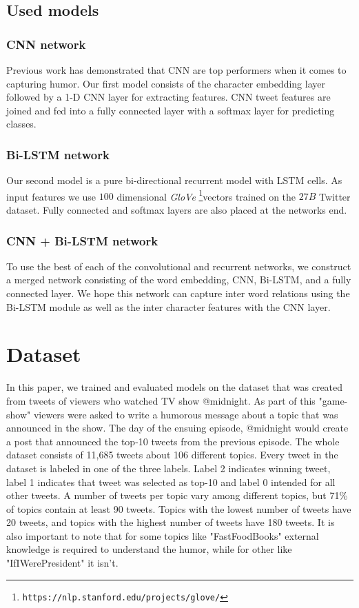 \documentclass[10pt, a4paper]{article}
\begin{document}
\subsection{Used models}

\subsubsection{CNN network}
Previous work \citep{onaj_rad_s_cnn} has demonstrated that CNN are top performers
when it comes to capturing humor. Our first model consists of the character
embedding layer followed by a 1-D CNN layer for extracting features. CNN tweet
features are joined and fed into a fully connected layer with a softmax layer
for predicting classes. 

\subsubsection{Bi-LSTM network}
Our second model is a pure bi-directional recurrent model with LSTM cells. As
input features we use $100$ dimensional \emph{GloVe}
\citep{GLove}\footnote{\texttt{https://nlp.stanford.edu/projects/glove/}}vectors trained on the $27B$
Twitter dataset. Fully connected and softmax layers are also placed at the
networks end.

\subsubsection{CNN + Bi-LSTM network}
To use the best of each of the convolutional and recurrent networks, we
construct a merged network consisting of the word embedding, CNN, Bi-LSTM, and
a fully connected layer. We hope this network can capture inter word relations
using the Bi-LSTM module as well as the inter character features with the CNN
layer.

\section{Dataset}

In this paper, we trained and evaluated models on the dataset that was created from tweets of viewers who watched TV show @midnight. As part of this "game-show" viewers were asked to write a humorous message about a topic that was announced in the show. The day of the ensuing episode, @midnight would create a post that announced the top-10 tweets from the previous episode. The whole dataset consists of 11,685 tweets about 106 different topics. Every tweet in the dataset is labeled in one of the three labels. Label 2 indicates winning tweet, label 1 indicates that tweet was selected as top-10 and label 0 intended for all other tweets. A number of tweets per topic vary among different topics, but 71\% of topics contain at least 90 tweets. Topics with the lowest number of tweets have 20 tweets, and topics with the highest number of tweets have 180 tweets. It is also important to note that for some topics like "FastFoodBooks" external knowledge is required to understand the humor, while for other like "IfIWerePresident" it isn't.
\end{document}
